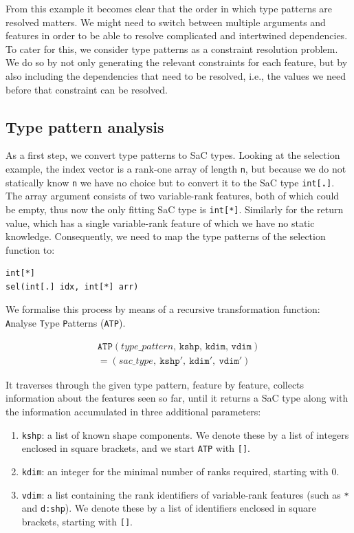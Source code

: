 \documentclass[sigconf,screen]{acmart}
\newcommand{\tpdot}{\texttt{\textbf{.}}}
\newcommand{\atp}[4]{\ensuremath{\texttt{ATP}(#1,\,#2,\,#3,\,#4)}}
\newcommand{\fshp}{\texttt{kshp}}
\newcommand{\fdim}{\texttt{kdim}}
\newcommand{\vdim}{\texttt{vdim}}
\begin{document}
From this example it becomes clear that the order in which type patterns are resolved matters.
We might need to switch between multiple arguments and features in order to be able to resolve complicated and intertwined dependencies.
To cater for this, we consider type patterns as a constraint resolution problem.
We do so by not only generating the relevant constraints for each feature, but by also including the dependencies that need to be resolved, i.e., the values we need before that constraint can be resolved.

\subsection{Type pattern analysis}\label{sec:atp}
As a first step, we convert type patterns to SaC types.
Looking at the selection example, the index vector is a rank-one array of length \texttt{n}, but because we do not statically know \texttt{n} we have no choice but to convert it to the SaC type \texttt{int[\tpdot]}.
The array argument consists of two variable-rank features, both of which could be empty, thus now the only fitting SaC type is \texttt{int[*]}.
Similarly for the return value, which has a single variable-rank feature of which we have no static knowledge.
Consequently, we need to map the type patterns of the selection function to:

\begin{lstlisting}
int[*]
sel(int[.] idx, int[*] arr)
\end{lstlisting}

We formalise this process by means of a recursive transformation function: \texttt{A}nalyse \texttt{T}ype \texttt{P}atterns (\texttt{ATP}).

\begin{gather*}
  \atp{type\_pattern}{\fshp}{\fdim}{\vdim} \\
    = (sac\_type,\ \fshp',\ \fdim',\ \vdim')
\end{gather*}

It traverses through the given type pattern, feature by feature, collects information about the features seen so far, until it returns a SaC type along with the information accumulated in three additional parameters:
\begin{enumerate}
  \item \fshp{}: a list of known shape components.
  We denote these by a list of integers enclosed in square brackets, and we start \texttt{ATP} with \texttt{[]}.
  \item \fdim{}: an integer for the minimal number of ranks required, starting with 0.
  \item \vdim{}: a list containing the rank identifiers of variable-rank features (such as \texttt{*} and \texttt{d:shp}).
  We denote these by a list of identifiers enclosed in square brackets, starting with \texttt{[]}.
\end{enumerate}
\end{document}
